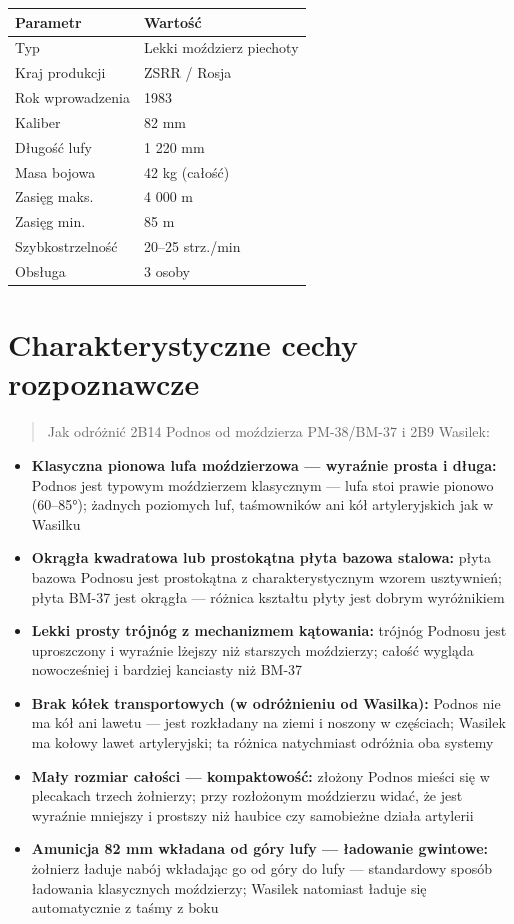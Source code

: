 \documentclass[12pt,openany,oneside]{book}
\providecommand{\tightlist}{%
  \setlength{\itemsep}{0pt}\setlength{\parskip}{0pt}}
\begin{document}
\begin{longtable}[]{@{}ll@{}}
\toprule\noalign{}
Parametr & Wartość \\
\midrule\noalign{}
\endhead
\bottomrule\noalign{}
\endlastfoot
Typ & Lekki moździerz piechoty \\
Kraj produkcji & ZSRR / Rosja \\
Rok wprowadzenia & 1983 \\
Kaliber & 82 mm \\
Długość lufy & 1 220 mm \\
Masa bojowa & 42 kg (całość) \\
Zasięg maks. & 4 000 m \\
Zasięg min. & 85 m \\
Szybkostrzelność & 20--25 strz./min \\
Obsługa & 3 osoby \\
\end{longtable}

\section{Charakterystyczne cechy
rozpoznawcze}\label{charakterystyczne-cechy-rozpoznawcze-25}

\begin{quote}
Jak odróżnić 2B14 Podnos od moździerza PM-38/BM-37 i 2B9 Wasilek:
\end{quote}

\begin{itemize}
\tightlist
\item
  \textbf{Klasyczna pionowa lufa moździerzowa --- wyraźnie prosta i
  długa:} Podnos jest typowym moździerzem klasycznym --- lufa stoi
  prawie pionowo (60--85°); żadnych poziomych luf, taśmowników ani kół
  artyleryjskich jak w Wasilku
\item
  \textbf{Okrągła kwadratowa lub prostokątna płyta bazowa stalowa:}
  płyta bazowa Podnosu jest prostokątna z charakterystycznym wzorem
  usztywnień; płyta BM-37 jest okrągła --- różnica kształtu płyty jest
  dobrym wyróżnikiem
\item
  \textbf{Lekki prosty trójnóg z mechanizmem kątowania:} trójnóg Podnosu
  jest uproszczony i wyraźnie lżejszy niż starszych moździerzy; całość
  wygląda nowocześ­niej i bardziej kanciasty niż BM-37
\item
  \textbf{Brak kółek transportowych (w odróżnieniu od Wasilka):} Podnos
  nie ma kół ani lawetu --- jest rozkładany na ziemi i noszony w
  częściach; Wasilek ma kołowy lawet artyleryjski; ta różnica
  natychmiast odróżnia oba systemy
\item
  \textbf{Mały rozmiar całości --- kompaktowość:} złożony Podnos mieści
  się w plecakach trzech żołnierzy; przy rozłożonym moździerzu widać, że
  jest wyraźnie mniejszy i prostszy niż haubice czy samobieżne działa
  artylerii
\item
  \textbf{Amunicja 82 mm wkładana od góry lufy --- ładowanie gwintowe:}
  żołnierz ładuje nabój wkładając go od góry do lufy --- standardowy
  sposób ładowania klasycznych moździerzy; Wasilek natomiast ładuje się
  automatycznie z taśmy z boku
\end{itemize}
\end{document}
